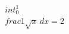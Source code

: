 \documentclass[preview]{standalone}
\begin{document}
\begin{align*}
\quad\\int_{0}^{1} \quad\\frac{1}{\sqrt{x}} \, dx = 2
\end{align*}
\end{document}
